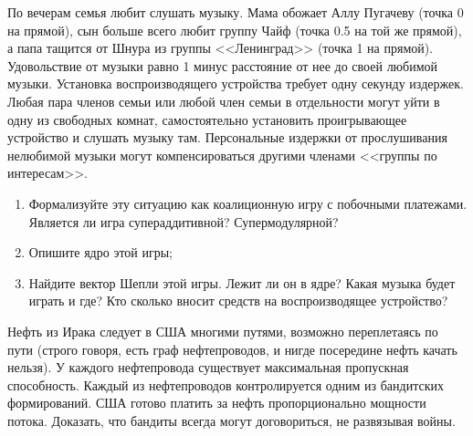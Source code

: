 \begin{problem}
\begin{source}
\cite{savva:nmu}
\end{source}
 По вечерам семья любит слушать музыку. Мама обожает Аллу Пугачеву (точка 0 на прямой), сын больше всего любит группу Чайф (точка 0.5 на той же прямой), а папа тащится от Шнура из группы <<Ленинград>> (точка 1 на прямой). Удовольствие от музыки равно 1 минус расстояние от нее до своей любимой музыки.
Установка воспроизводящего устройства требует одну секунду издержек. Любая пара членов семьи или любой член семьи в отдельности могут уйти в одну из свободных комнат, самостоятельно установить проигрывающее устройство и слушать музыку там. Персональные издержки от прослушивания нелюбимой музыки могут компенсироваться другими членами <<группы по интересам>>.
\begin{enumerate}
\item Формализуйте эту ситуацию как коалиционную игру с побочными платежами. Является ли игра супераддитивной? Супермодулярной?
\item Опишите ядро этой игры;
\item Найдите вектор Шепли этой игры. Лежит ли он в ядре? Какая музыка будет играть и где? Кто сколько вносит средств на воспроизводящее устройство?
\end{enumerate}


\begin{sol}

\end{sol}
\end{problem}




\begin{problem}
\begin{source}
\cite{savva:nmu}
\end{source}
 Нефть из Ирака следует в США многими путями, возможно переплетаясь по пути (строго говоря, есть граф нефтепроводов, и нигде посередине нефть качать нельзя). У каждого нефтепровода существует максимальная пропускная способность. Каждый из нефтепроводов контролируется одним из бандитских формирований. США готово платить за нефть пропорционально мощности потока. Доказать, что бандиты всегда могут договориться, не развязывая войны.






\begin{sol}

\end{sol}
\end{problem}




